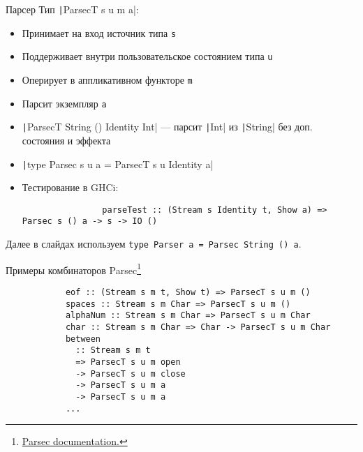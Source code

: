     \begin{frame}[fragile]{Парсер}
        \vspace{-0.5em}
        Тип \texttt|ParsecT s u m a|:
        \begin{itemize}
            \item Принимает на вход источник типа \texttt{s}
            \item Поддерживает внутри пользовательское состоянием типа \texttt{u}
            \item Оперирует в аппликативном функторе \texttt{m}
            \item Парсит экземпляр \texttt{a}
            \item[\eg] \texttt|ParsecT String () Identity Int| --- парсит \texttt|Int| из \texttt|String| без доп. состояния и эффекта
            \item \texttt|type Parsec s u a = ParsecT s u Identity a|
            \item Тестирование в GHCi:
            \begin{verbatim}
                parseTest :: (Stream s Identity t, Show a) => Parsec s () a -> s -> IO ()
            \end{verbatim}
        \end{itemize}
        \pause
        Далее в слайдах используем \texttt{type Parser a = Parsec String () a}.
    \end{frame}

    \begin{frame}[fragile]{Примеры комбинаторов Parsec\footnote{\href{https://hackage.haskell.org/package/parsec-3.1.15.1/docs/Text-Parsec.html}{\color{blue}Parsec documentation.}}}
        \vspace{-0.5em}
        \begin{verbatim}
            eof :: (Stream s m t, Show t) => ParsecT s u m ()
            spaces :: Stream s m Char => ParsecT s u m ()
            alphaNum :: Stream s m Char => ParsecT s u m Char
            char :: Stream s m Char => Char -> ParsecT s u m Char
            between
              :: Stream s m t
              => ParsecT s u m open
              -> ParsecT s u m close
              -> ParsecT s u m a
              -> ParsecT s u m a
            ...
        \end{verbatim}
    \end{frame}

